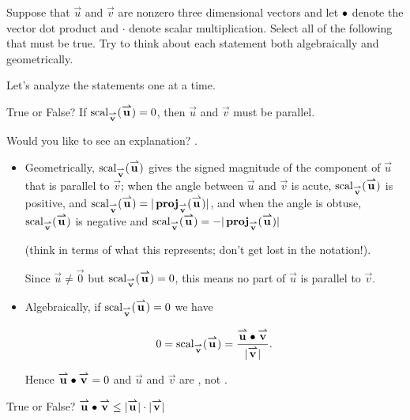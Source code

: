 \documentclass{ximera}
\author{Jim Talamo}
\begin{document}
\begin{exercise}
Suppose that $\vec{u}$ and $\vec{v}$ are nonzero three dimensional vectors and let $\dotp$ denote the vector dot product and $\cdot$ denote scalar multiplication.  Select all of the following that must be true.  Try to think about each statement both algebraically and geometrically.

\begin{selectAll}

\begin{hint}
Let's analyze the statements one at a time.
\begin{problem}
True or False? If $\scal_\vec{v}(\vec{u}) =0$, then $\vec{u}$ and $\vec{v}$ must be parallel.

Would you like to see an explanation?
.

\begin{question}
\begin{itemize}
\item Geometrically, $\scal_\vec{v}(\vec{u})$ gives the signed magnitude of the component of $\vec{u}$ that is parallel to $\vec{v}$; when the angle between $\vec{u}$ and $\vec{v}$ is acute, $\scal_\vec{v}(\vec{u})$ is positive, and $\scal_\vec{v}(\vec{u}) = |\proj_\vec{v}(\vec{u})|$, and when the angle is obtuse, $\scal_\vec{v}(\vec{u})$  is negative and $\scal_\vec{v}(\vec{u}) = -|\proj_\vec{v}(\vec{u})|$ 

(think in terms of what this represents; don't get lost in the notation!).

Since $\vec{u} \neq \vec{0}$ but $\scal_\vec{v}(\vec{u}) =0$, this means no part of $\vec{u}$ is parallel to $\vec{v}$.

\item Algebraically, if $\scal_\vec{v}(\vec{u}) =0$ we have

\[
0 = \scal_\vec{v}(\vec{u}) = \frac{\vec{u} \dotp \vec{v}}{|\vec{v}|}.
\]

Hence $\vec{u} \dotp \vec{v} = 0$ and $\vec{u}$ and $\vec{v}$ are , not .
\end{itemize}
\end{question}
\end{problem}
\begin{problem}
True or False?  $\vec{u} \dotp \vec{v} \leq |\vec{u}| \cdot |\vec{v}|$


\end{problem}
\end{hint}
\end{selectAll}
\end{exercise}
\end{document}
